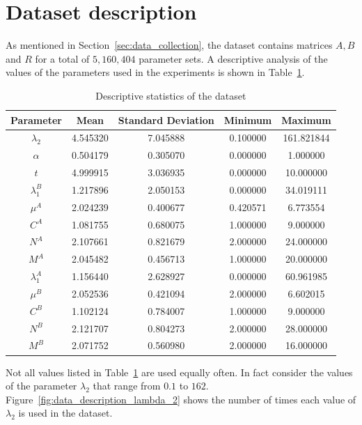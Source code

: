 \section{Dataset description}\label{sec:dataset_description}

As mentioned in Section~\ref{sec:data_collection}, the dataset contains
matrices \(A, B\) and \(R\) for a total of \(5,160,404\) parameter sets.
A descriptive analysis of the values of the parameters used in the experiments
is shown in Table~\ref{tab:parameters_descriptive}.


\begin{table}[H]
    \centering
    \caption{Descriptive statistics of the dataset}
    \begin{tabular}{|c|cccc|}
        \hline
        Parameter & Mean & Standard Deviation & Minimum & Maximum \\
        \hline
        \(\lambda_2\) & 4.545320 & 7.045888 & 0.100000 & 161.821844 \\
        \(\alpha\) & 0.504179 & 0.305070 & 0.000000 & 1.000000 \\
        \(t\) & 4.999915 & 3.036935 & 0.000000 & 10.000000 \\
        \hline
        \(\lambda_1^B\) & 1.217896 & 2.050153 & 0.000000 & 34.019111 \\
        \(\mu^A\) & 2.024239 & 0.400677 & 0.420571 & 6.773554 \\
        \(C^A\) & 1.081755 & 0.680075 & 1.000000 & 9.000000 \\
        \(N^A\) & 2.107661 & 0.821679 & 2.000000 & 24.000000 \\
        \(M^A\) & 2.045482 & 0.456713 & 1.000000 & 20.000000 \\
        \hline
        \(\lambda_1^A\) & 1.156440 & 2.628927 & 0.000000 & 60.961985 \\
        \(\mu^B\) & 2.052536 & 0.421094 & 2.000000 & 6.602015 \\
        \(C^B\) & 1.102124 & 0.784007 & 1.000000 & 9.000000 \\
        \(N^B\) & 2.121707 & 0.804273 & 2.000000 & 28.000000 \\
        \(M^B\) & 2.071752 & 0.560980 & 2.000000 & 16.000000 \\
        \hline
    \end{tabular}
    \label{tab:parameters_descriptive}
\end{table}


Not all values listed in Table~\ref{tab:parameters_descriptive} are used equally
often.
In fact consider the values of the parameter \(\lambda_2\) that range from
\(0.1\) to \(162\).
Figure~\ref{fig:data_description_lambda_2} shows the number of times each
value of \(\lambda_2\) is used in the dataset.

